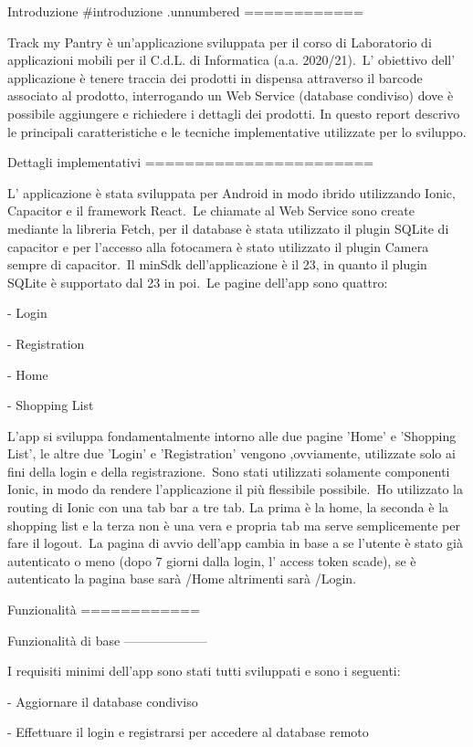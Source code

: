 Introduzione {#introduzione .unnumbered}
============

Track my Pantry è un’applicazione sviluppata per il corso di Laboratorio
di applicazioni mobili per il C.d.L. di Informatica (a.a. 2020/21).\
L’ obiettivo dell’ applicazione è tenere traccia dei prodotti in
dispensa attraverso il barcode associato al prodotto, interrogando un
Web Service (database condiviso) dove è possibile aggiungere e
richiedere i dettagli dei prodotti. In questo report descrivo le
principali caratteristiche e le tecniche implementative utilizzate per
lo sviluppo.

Dettagli implementativi
=======================

L’ applicazione è stata sviluppata per Android in modo ibrido
utilizzando Ionic, Capacitor e il framework React.\
Le chiamate al Web Service sono create mediante la libreria Fetch, per
il database è stata utilizzato il plugin SQLite di capacitor e per
l’accesso alla fotocamera è stato utilizzato il plugin Camera sempre di
capacitor.\
Il minSdk dell’applicazione è il 23, in quanto il plugin SQLite è
supportato dal 23 in poi.\
Le pagine dell’app sono quattro:

-   Login

-   Registration

-   Home

-   Shopping List

L’app si sviluppa fondamentalmente intorno alle due pagine ’Home’ e
’Shopping List’, le altre due ’Login’ e ’Registration’ vengono
,ovviamente, utilizzate solo ai fini della login e della registrazione.\
Sono stati utilizzati solamente componenti Ionic, in modo da rendere
l’applicazione il più flessibile possibile.\
Ho utilizzato la routing di Ionic con una tab bar a tre tab. La prima è
la home, la seconda è la shopping list e la terza non è una vera e
propria tab ma serve semplicemente per fare il logout.\
La pagina di avvio dell’app cambia in base a se l’utente è stato già
autenticato o meno (dopo 7 giorni dalla login, l’ access token scade),
se è autenticato la pagina base sarà /Home altrimenti sarà /Login.\

Funzionalità
============

Funzionalità di base
--------------------

I requisiti minimi dell’app sono stati tutti sviluppati e sono i
seguenti:

-   Aggiornare il database condiviso

-   Effettuare il login e registrarsi per accedere al database remoto

